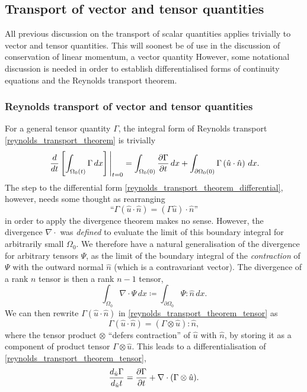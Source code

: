 \subsection{Transport of vector and tensor quantities}
All previous discussion on the transport of scalar quantities applies trivially to vector and tensor quantities.
This will soonest be of use in the discussion of conservation of linear momentum, a vector quantity
However, some notational discussion is needed in order to establish differentialised forms of continuity equations and the Reynolds transport theorem.
\subsubsection{Reynolds transport of vector and tensor quantities}
For a general tensor quantity $\Gamma$, the integral form of Reynolds transport \eqref{reynolds_transport_theorem} is trivially
\begin{equation}\label{reynolds_transport_theorem_tensor}
    \eval{\frac{d}{dt}\left[\int_{\Omega_0(t)}\Gamma\,dx\right]}_{t=0} =
        \int_{\Omega_0(0)}\Part{\Gamma}{t}\,dx + \int_{\partial\Omega_0(0)}\Gamma \left(\hat{u}\cdot\hat{n}\right) \,dx.
\end{equation}
The step to the differential form \eqref{reynolds_transport_theorem_differential}, however, needs some thought
as rearranging
    $$\text{``}\Gamma\left(\hat{u}\cdot \hat{n}\right) = (\Gamma\hat{u})\cdot \hat{n}\text{''}$$
in order to apply the divergence theorem makes no sense. However, the divergence $\nabla \cdot$ was \textit{defined}
to evaluate the limit of this boundary integral for arbitrarily small $\Omega_0$. We therefore have a natural generalisation of the
divergence for arbitrary tensors $\Psi$, as the limit of the boundary integral of the \textit{contraction} of $\Psi$ with the outward normal
$\hat{n}$ (which is a contravariant vector). The divergence of a rank $n$ tensor is then a rank $n-1$ tensor,
\begin{equation}\label{tensor_divergence}
    \int_{\Omega_0} \nabla\cdot\Psi\,dx \coloneqq
        \int_{\partial{\Omega_0}} \Psi : \hat{n}\,dx.
\end{equation}
We can then rewrite $\Gamma \left(\hat{u}\cdot \hat{n}\right)$ in \eqref{reynolds_transport_theorem_tensor} as
    $$\Gamma \left(\hat{u}\cdot \hat{n}\right) = \left(\Gamma \otimes \hat{u}\right) : \hat{n},$$
where the tensor product $\otimes$ ``defers contraction'' of $\hat{u}$ with $\hat{n}$, by storing it as a component of product tensor $\Gamma \otimes \hat{u}$.
This leads to a differentialisation of \eqref{reynolds_transport_theorem_tensor},
\begin{equation}\label{reynolds_transport_theorem_tensor_differential}
    \frac{d_{\hat{u}}\Gamma}{d_{\hat{u}}t} = \frac{\partial \Gamma}{\partial t} + \nabla \cdot(\Gamma \otimes \hat{u}).
\end{equation}
